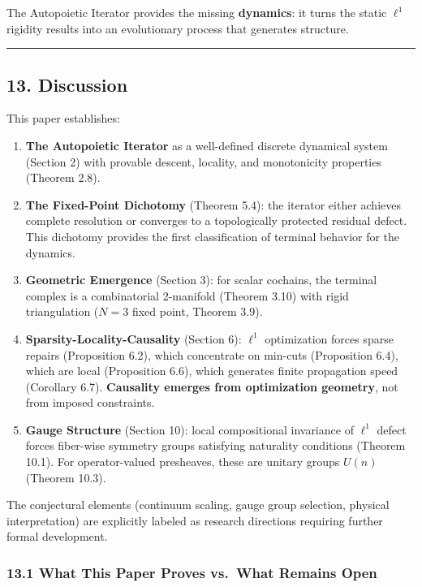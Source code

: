 \documentclass[
]{article}
\begin{document}
The Autopoietic Iterator provides the missing \textbf{dynamics}: it
turns the static \(\ell^1\) rigidity results into an evolutionary
process that generates structure.

\begin{center}\rule{0.5\linewidth}{0.5pt}\end{center}

\subsection{13. Discussion}\label{discussion}

This paper establishes:

\begin{enumerate}
\def\labelenumi{\arabic{enumi}.}
\item
  \textbf{The Autopoietic Iterator} as a well-defined discrete dynamical
  system (Section 2) with provable descent, locality, and monotonicity
  properties (Theorem 2.8).
\item
  \textbf{The Fixed-Point Dichotomy} (Theorem 5.4): the iterator either
  achieves complete resolution or converges to a topologically protected
  residual defect. This dichotomy provides the first classification of
  terminal behavior for the dynamics.
\item
  \textbf{Geometric Emergence} (Section 3): for scalar cochains, the
  terminal complex is a combinatorial 2-manifold (Theorem 3.10) with
  rigid triangulation (\(N=3\) fixed point, Theorem 3.9).
\item
  \textbf{Sparsity-Locality-Causality} (Section 6): \(\ell^1\)
  optimization forces sparse repairs (Proposition 6.2), which
  concentrate on min-cuts (Proposition 6.4), which are local
  (Proposition 6.6), which generates finite propagation speed (Corollary
  6.7). \textbf{Causality emerges from optimization geometry}, not from
  imposed constraints.
\item
  \textbf{Gauge Structure} (Section 10): local compositional invariance
  of \(\ell^1\) defect forces fiber-wise symmetry groups satisfying
  naturality conditions (Theorem 10.1). For operator-valued presheaves,
  these are unitary groups \(U(n)\) (Theorem 10.3).
\end{enumerate}

The conjectural elements (continuum scaling, gauge group selection,
physical interpretation) are explicitly labeled as research directions
requiring further formal development.

\subsubsection{13.1 What This Paper Proves vs.~What Remains
Open}\label{what-this-paper-proves-vs.-what-remains-open}
\end{document}
